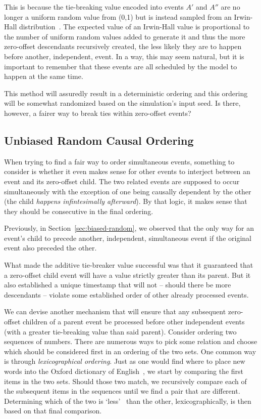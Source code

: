 \documentclass[nonacm,sigconf]{acmart}
\begin{document}
This is because the tie-breaking value encoded into events $A'$ and $A''$ are no longer a uniform random value from (0,1) but is instead sampled from an Irwin-Hall distribution~\cite{johnson1995continuous}. The expected value of an Irwin-Hall value is proportional to the number of uniform random values added to generate it and thus the more zero-offset descendants recursively created, the less likely they are to happen before another, independent, event. In a way, this may seem natural, but it is important to remember that these events are all scheduled by the model to happen at the same time. 

This method will assuredly result in a deterministic ordering and this ordering will be somewhat randomized based on the simulation's input seed. Is there, however, a fairer way to break ties within zero-offset events?

\subsection{Unbiased Random Causal Ordering}\label{sec:unbiased-causal}
When trying to find a fair way to order simultaneous events, something to consider is whether it even makes sense for other events to interject between an event and its zero-offset child. The two related events are supposed to occur simultaneously with the exception of one being causally dependent by the other (the child \emph{happens infintesimally afterward}). By that logic, it makes sense that they should be consecutive in the final ordering. 

Previously, in Section~\ref{sec:biased-random}, we observed that the only way for an event's child to precede another, independent, simultaneous event if the original event also preceded the other.

What made the additive tie-breaker value successful was that it guaranteed that a zero-offset child event will have a value strictly greater than its parent. But it also established a unique timestamp that will not -- should there be more descendants -- violate some established order of other already processed events.

We can devise another mechanism that will ensure that any subsequent zero-offset children of a parent event be processed before other independent events (with a greater tie-breaking value than said parent). Consider ordering two sequences of numbers. There are numerous ways to pick some relation and choose which should be considered first in an ordering of the two sets. One common way is through \emph{lexicographical ordering}. Just as one would find where to place new words into the Oxford dictionary of English~\cite{stevenson2010oxford}, we start by comparing the first items in the two sets. Should those two match, we recursively compare each of the subsequent items in the sequences until we find a pair that are different. Determining which of the two is \lq less\rq~ than the other, lexicographically, is then based on that final comparison.
\end{document}
